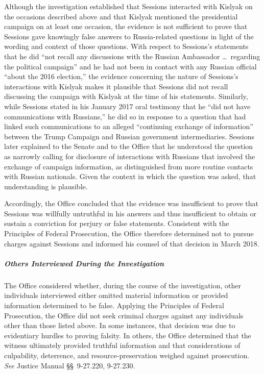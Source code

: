 Although the investigation established that Sessions interacted with Kislyak on the occasions described above and that Kislyak mentioned the presidential campaign on at least one occasion, the evidence is not sufficient to prove that Sessions gave knowingly false answers to Russia-related questions in light of the wording and context of those questions.
With respect to Sessions's statements that he did ``not recall any discussions with the Russian Ambassador \dots\ regarding the political campaign'' and he had not been in contact with any Russian official ``about the 2016 election,'' the evidence concerning the nature of Sessions's interactions with Kislyak makes it plausible that Sessions did not recall discussing the campaign with Kislyak at the time of his statements.
Similarly, while Sessions stated in his January 2017 oral testimony that he ``did not have communications with Russians,'' he did so in response to a question that had linked such communications to an alleged ``continuing exchange of information'' between the Trump Campaign and Russian government intermediaries.
Sessions later explained to the Senate and to the Office that he understood the question as narrowly calling for disclosure of interactions with Russians that involved the exchange of campaign information, as distinguished from more routine contacts with Russian nationals.
Given the context in which the question was asked, that understanding is plausible.

Accordingly, the Office concluded that the evidence was insufficient to prove that Sessions was willfully untruthful in his answers and thus insufficient to obtain or sustain a conviction for perjury or false statements.
Consistent with the Principles of Federal Prosecution, the Office therefore determined not to pursue charges against Sessions and informed his counsel of that decision in March 2018.

\subparagraph{Others Interviewed During the Investigation}
The Office considered whether, during the course of the investigation, other individuals interviewed either omitted material information or provided information determined to be false.
Applying the Principles of Federal Prosecution, the Office did not seek criminal charges against any individuals other than those listed above.
In some instances, that decision was due to evidentiary hurdles to proving falsity.
In others, the Office determined that the witness ultimately provided truthful information and that considerations of culpability, deterrence, and resource-preservation weighed against prosecution.
\textit{See} Justice Manual \S\S~9-27.220, 9-27.230.






